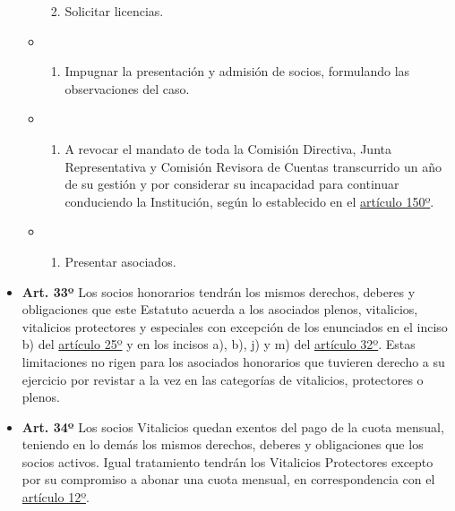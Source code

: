 \documentclass[]{book}
\providecommand{\tightlist}{%
  \setlength{\itemsep}{0pt}\setlength{\parskip}{0pt}}
\begin{document}
\begin{itemize}
\begin{itemize}
    \begin{enumerate}
    \def\labelenumi{\alph{enumi})}
    \setcounter{enumi}{10}
    \tightlist
    \item
      Solicitar licencias.
    \end{enumerate}
  \item
    \begin{enumerate}
    \def\labelenumi{\alph{enumi})}
    \setcounter{enumi}{11}
    \tightlist
    \item
      Impugnar la presentación y admisión de socios, formulando las observaciones del caso.
    \end{enumerate}
  \item
    \begin{enumerate}
    \def\labelenumi{\alph{enumi})}
    \setcounter{enumi}{12}
    \tightlist
    \item
      A revocar el mandato de toda la Comisión Directiva, Junta Representativa y Comisión Revisora de Cuentas transcurrido un año de su gestión y por considerar su incapacidad para continuar conduciendo la Institución, según lo establecido en el \protect\hyperlink{art150}{artículo 150º}.
    \end{enumerate}
  \item
    \begin{enumerate}
    \def\labelenumi{\alph{enumi})}
    \setcounter{enumi}{13}
    \tightlist
    \item
      Presentar asociados.
    \end{enumerate}
  \end{itemize}
\end{itemize}

\begin{itemize}
\tightlist
\item
  \textbf{Art. 33º}
  Los socios honorarios tendrán los mismos derechos, deberes y obligaciones que este Estatuto acuerda a los asociados plenos, vitalicios, vitalicios protectores y especiales con excepción de los enunciados en el inciso b) del \protect\hyperlink{art25}{artículo 25º} y en los incisos a), b), j) y m) del \protect\hyperlink{art32}{artículo 32º}. Estas limitaciones no rigen para los asociados honorarios que tuvieren derecho a su ejercicio por revistar a la vez en las categorías de vitalicios, protectores o plenos.
\end{itemize}

\begin{itemize}
\tightlist
\item
  \textbf{Art. 34º}
  Los socios Vitalicios quedan exentos del pago de la cuota mensual, teniendo en lo demás los mismos derechos, deberes y obligaciones que los socios activos. Igual tratamiento tendrán los Vitalicios Protectores excepto por su compromiso a abonar una cuota mensual, en correspondencia con el \protect\hyperlink{art12}{artículo 12º}.
\end{itemize}
\end{document}
